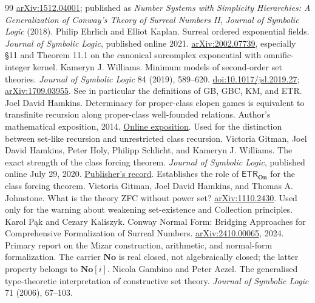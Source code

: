 \documentclass[11pt,letterpaper]{article}
\numberwithin{equation}{section}
\theoremstyle{definition}
\theoremstyle{remark}
\newcommand{\No}{\mathbf{No}}
\newcommand{\On}{\mathbf{On}}
\newcommand{\ETR}{\mathsf{ETR}}
\begin{document}
\begin{thebibliography}{99}
\href{https://arxiv.org/abs/1512.04001}{arXiv:1512.04001}; published as \emph{Number Systems with Simplicity Hierarchies: A Generalization of Conway's Theory of Surreal Numbers II}, \emph{Journal of Symbolic Logic} (2018).
Philip Ehrlich and Elliot Kaplan. Surreal ordered exponential fields.
\emph{Journal of Symbolic Logic}, published online 2021.
\href{https://arxiv.org/abs/2002.07739}{arXiv:2002.07739}, especially \S11 and Theorem 11.1 on the canonical surcomplex exponential with omnific-integer kernel.
Kameryn J. Williams. Minimum models of second-order set theories.
\emph{Journal of Symbolic Logic} 84 (2019), 589--620.
\href{https://doi.org/10.1017/jsl.2019.27}{doi:10.1017/jsl.2019.27};
\href{https://arxiv.org/abs/1709.03955}{arXiv:1709.03955}. See in particular the definitions of GB, GBC, KM, and ETR.
Joel David Hamkins. Determinacy for proper-class clopen games is equivalent to transfinite recursion along proper-class well-founded relations. Author's mathematical exposition, 2014.
\href{https://jdh.hamkins.org/determinacy-for-proper-class-clopen-games-is-equivalent-to-transfinite-recursion-along-proper-class-well-founded-relations/}{Online exposition}. Used for the distinction between set-like recursion and unrestricted class recursion.
Victoria Gitman, Joel David Hamkins, Peter Holy, Philipp Schlicht, and Kameryn J. Williams. The exact strength of the class forcing theorem.
\emph{Journal of Symbolic Logic}, published online July 29, 2020.
\href{https://www.cambridge.org/core/journals/journal-of-symbolic-logic/article/abs/exact-strength-of-the-class-forcing-theorem/2295032404B1308A9D4D91065F514FA1}{Publisher's record}. Establishes the role of $\ETR_{\On}$ for the class forcing theorem.
Victoria Gitman, Joel David Hamkins, and Thomas A. Johnstone. What is the theory ZFC without power set?
\href{https://arxiv.org/abs/1110.2430}{arXiv:1110.2430}. Used only for the warning about weakening set-existence and Collection principles.
Karol P\k{a}k and Cezary Kaliszyk. Conway Normal Form: Bridging Approaches for Comprehensive Formalization of Surreal Numbers.
\href{https://arxiv.org/abs/2410.00065}{arXiv:2410.00065}, 2024. Primary report on the Mizar construction, arithmetic, and normal-form formalization. The carrier $\No$ is real closed, not algebraically closed; the latter property belongs to $\No[i]$.
Nicola Gambino and Peter Aczel. The generalised type-theoretic interpretation of constructive set theory.
\emph{Journal of Symbolic Logic} 71 (2006), 67--103.

\end{thebibliography}
\end{document}
